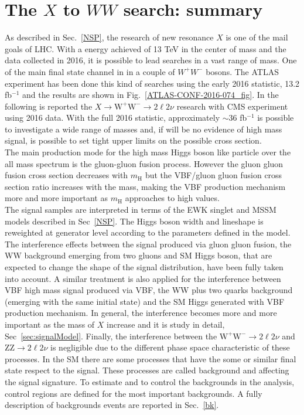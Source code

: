 
\section{The $X$ to $WW$ search: summary}\label{sec:AnalysisStrategy_Intro}
As described in Sec.~\ref{NSP}, the research of  new resonance $X$ is one of the mail goals of LHC. With a energy achieved of 13 TeV in the center of mass and the data collected in 2016, it is possible to lead searches in a vast range of mass. One of the main final state channel in in a couple of $W^+W^-$ bosons.
The ATLAS experiment has been done this kind of searches using the early 2016 statistic, 13.2 fb$^{-1}$ and the results are shown in Fig.~\ref{ATLAS-CONF-2016-074_fig}. In the following is reported the $X \to \mathrm{W^+W^-}\to2\ell2\nu$ research with CMS experiment using 2016 data.
With the full 2016 statistic, approximately $\sim 36$ fb$^{-1}$ is possible to investigate a wide range of masses and, if will be no evidence of high mass signal, is possible to set  tight upper limits on the possible cross section. \\
\newline
The main production mode for the high mass Higgs boson like particle over the all mass spectrum is the gluon-gluon fusion process. 
However the  gluon gluon fusion cross section decreases with $m_\mathrm{H}$ but the VBF/gluon gluon fusion cross section ratio increases with the mass, making the VBF production mechanism more and more important as $m_\mathrm{H}$ approaches to high values.\\
The signal samples are interpreted in terms of the EWK singlet and MSSM models described in Sec~\ref{NSP}. 
The Higgs boson width and lineshape is reweighted at generator level according to the parameters defined in the model.
The interference effects between the signal produced  via gluon gluon fusion, the WW background emerging from two gluons and SM
Higgs boson, that are expected to change the shape of the signal distribution, have been fully taken into account. 
A similar treatment is also applied for the interference between VBF high mass signal produced via VBF, the  WW plus two quarks background (emerging with the same initial state)  and the SM Higgs generated with  VBF production mechanism. In general, the interference becomes more and more important as the mass of $X$ increase and it is study in detail, Sec~\ref{sec:signalModel}.
Finally, the interference between the $\mathrm{W^+W^-}\to2\ell2\nu$ and $\mathrm{ZZ}\to2\ell2\nu$ is negligible due to the different phase space characteristic of these processes. In the SM there are some processes that have the some or similar final state respect to the signal. These processes are called background and affecting the signal signature. To estimate and to control the backgrounds in the analysis, control regions are defined for the most important backgrounds. A fully description of backgrounds events are reported in Sec.~\ref{bk}. \\
